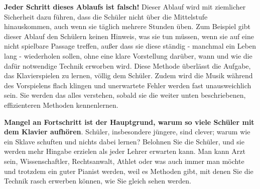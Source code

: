 \textbf{Jeder Schritt dieses Ablaufs ist falsch!}
Dieser Ablauf wird mit ziemlicher Sicherheit dazu führen, dass die Schüler nicht über die Mittelstufe hinauskommen, auch wenn sie täglich mehrere Stunden üben.
Zum Beispiel gibt dieser Ablauf den Schülern keinen Hinweis, was sie tun müssen, wenn sie auf eine nicht spielbare Passage treffen, außer dass sie diese ständig - manchmal ein Leben lang - wiederholen sollen, ohne eine klare Vorstellung darüber, wann und wie die dafür notwendige Technik erworben wird.
Diese Methode überlässt die Aufgabe, das Klavierspielen zu lernen, völlig dem Schüler.
Zudem wird die Musik während des Vorspielens flach klingen und unerwartete Fehler werden fast unausweichlich sein.
Sie werden das alles verstehen, sobald sie die weiter unten beschriebenen, effizienteren Methoden kennenlernen.

\textbf{Mangel an Fortschritt ist der Hauptgrund, warum so viele Schüler mit dem Klavier aufhören}.
Schüler, insbesondere jüngere, sind clever; warum wie ein Sklave schuften und nichts dabei lernen?
Belohnen Sie die Schüler, und sie werden mehr Hingabe erzielen als jeder Lehrer erwarten kann.
Man kann Arzt sein, Wissenschaftler, Rechtsanwalt, Athlet oder was auch immer man möchte und trotzdem ein guter Pianist werden, weil es Methoden gibt, mit denen Sie die Technik rasch erwerben können, wie Sie gleich sehen werden.

